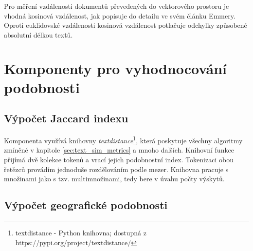 \documentclass[thesis=M,czech]{FITthesis}[2019/12/23]
\begin{document}
Pro měření vzdálenosti dokumentů převedených do vektorového prostoru je vhodná kosinová vzdálenost, jak popisuje do detailu ve svém článku\cite{emmery2017} Emmery. Oproti euklidovské vzdálenosti kosinová vzdálenost potlačuje odchylky způsobené absolutní délkou textů.

\newpage
\section{Komponenty pro vyhodnocování podobnosti}

\subsection{Výpočet Jaccard indexu}
\label{sec:component_jaccard_index}

Komponenta využívá knihovny \textit{textdistance}\footnote{textdistance - Python knihovna; dostupná z https://pypi.org/project/textdistance/}, která poskytuje všechny algoritmy zmíněné v kapitole \ref{sec:text_sim_metrics} a mnoho dalších. Knihovní funkce přijímá dvě kolekce tokenů a vrací jejich podobnostní index. Tokenizaci obou řetězců provádím jednoduše rozdělováním podle mezer. Knihovna pracuje s množinami jako s tzv. multimnožinami, tedy bere v úvahu počty výskytů.
    
\subsection{Výpočet geografické podobnosti}
\label{sec:component_geospatial_similarity}
    
\end{document}
